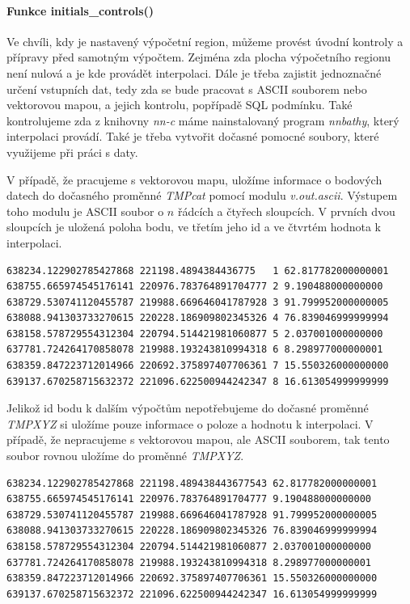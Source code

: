 \documentclass[12pt,a4paper]{article}
\begin{document}
\bigskip
\paragraph{Funkce initials\_controls()}
Ve chvíli, kdy je nastavený výpočetní region, můžeme provést úvodní kontroly a přípravy před samotným výpočtem. Zejména zda plocha výpočetního regionu není nulová a je kde provádět interpolaci. Dále je třeba zajistit jednoznačné určení vstupních dat, tedy zda se bude pracovat s ASCII souborem nebo vektorovou mapou, a jejich kontrolu, popřípadě SQL podmínku. Také kontrolujeme zda z knihovny \emph{nn-c} máme nainstalovaný program \emph{nnbathy}, který interpolaci provádí. Také je třeba vytvořit dočasné pomocné soubory, které využijeme při práci s daty. 

V případě, že pracujeme s vektorovou mapu, uložíme informace o bodových datech do dočasného proměnné \emph{TMPcat} pomocí modulu \emph{v.out.ascii}. Výstupem toho modulu je ASCII soubor o $n$ řádcích a čtyřech sloupcích. V prvních dvou sloupcích je uložená poloha bodu, ve třetím jeho id a ve čtvrtém hodnota k interpolaci. 

\bigskip
\lstset{basicstyle=\footnotesize}
\begin{lstlisting}[caption={Pomocný soubor TMPcat}]
638234.122902785427868 221198.4894384436775   1 62.817782000000001
638755.665974545176141 220976.783764891704777 2 9.190488000000000
638729.530741120455787 219988.669646041787928 3 91.799952000000005
638088.941303733270615 220228.186909802345326 4 76.839046999999994
638158.578729554312304 220794.514421981060877 5 2.037001000000000
637781.724264170858078 219988.193243810994318 6 8.298977000000001
638359.847223712014966 220692.375897407706361 7 15.550326000000000
639137.670258715632372 221096.622500944242347 8 16.613054999999999
\end{lstlisting}

Jelikož id bodu k dalším výpočtům nepotřebujeme do dočasné proměnné \emph{TMPXYZ} si uložíme pouze informace o poloze a hodnotu k interpolaci. V případě, že nepracujeme s vektorovou mapou, ale ASCII souborem, tak tento soubor rovnou uložíme do proměnné \emph{TMPXYZ}.

\bigskip
\lstset{basicstyle=\footnotesize}
\begin{lstlisting}[caption={Pomocný soubor TMPXYZ}]
638234.122902785427868 221198.489438443677543 62.817782000000001
638755.665974545176141 220976.783764891704777 9.190488000000000
638729.530741120455787 219988.669646041787928 91.799952000000005
638088.941303733270615 220228.186909802345326 76.839046999999994
638158.578729554312304 220794.514421981060877 2.037001000000000
637781.724264170858078 219988.193243810994318 8.298977000000001
638359.847223712014966 220692.375897407706361 15.550326000000000
639137.670258715632372 221096.622500944242347 16.613054999999999
\end{lstlisting}
\end{document}
